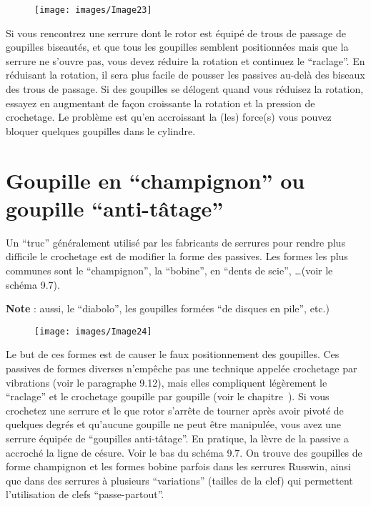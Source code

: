 \documentclass[a4paper,french,11pt,twoside]{report}
\begin{document}
\begin{figure}[ht] \begin{center}
        \texttt{[image: images/Image23]}
        \caption{}
\end{center} \end{figure}

Si vous rencontrez une serrure dont le rotor est équipé de trous de passage de goupilles biseautés, et que tous les goupilles semblent positionnées mais que la serrure ne s'ouvre pas, vous devez réduire la rotation et continuez le \enquote{raclage}. En réduisant la rotation, il sera plus facile de pousser les passives au-delà des biseaux des trous de passage. Si des goupilles se délogent quand vous réduisez la rotation, essayez en augmentant de façon croissante la rotation et la pression de crochetage. Le problème est qu'en accroissant la (les) force(s) vous pouvez bloquer quelques goupilles dans le cylindre.

\section{Goupille en  \enquote{champignon} ou goupille \enquote{anti-tâtage}}

Un \enquote{truc} généralement utilisé par les fabricants de serrures pour rendre plus difficile le crochetage est de modifier la forme des passives. Les formes les plus communes sont le \enquote{champignon}, la \enquote{bobine}, en \enquote{dents de scie}, \ldots (voir le schéma 9.7).

\noindent \textbf{Note} : aussi, le \enquote{diabolo}, les  goupilles formées \enquote{de disques en pile}, etc.)

\begin{figure}[ht] \begin{center}
        \texttt{[image: images/Image24]}
        \caption{}
\end{center} \end{figure}

Le but de ces formes est de causer le faux positionnement des goupilles. Ces passives de formes diverses n'empêche pas une technique appelée crochetage par vibrations (voir le paragraphe 9.12), mais elles compliquent légèrement le \enquote{raclage} et le crochetage goupille par goupille (voir le chapitre~).
Si vous crochetez une serrure et le que rotor s'arrête de tourner après avoir pivoté de quelques degrés et qu'aucune goupille ne peut être manipulée, vous avez une serrure équipée de \enquote{goupilles anti-tâtage}. En pratique, la lèvre de la passive a accroché la ligne de césure. Voir le bas du schéma 9.7. On trouve des goupilles de forme champignon et les formes bobine parfois dans les serrures Russwin, ainsi que dans des serrures à plusieurs \enquote{variations} (tailles de la clef) qui permettent l'utilisation de clefs \enquote{passe-partout}.
\end{document}
